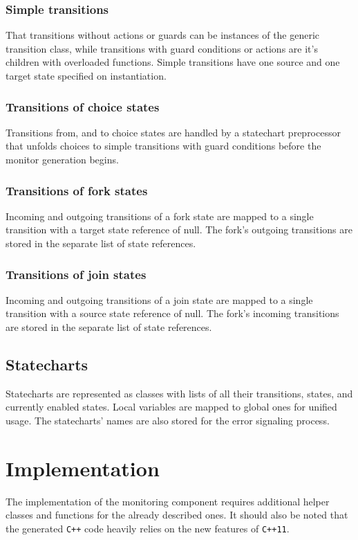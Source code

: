 {    \subsubsection{Simple transitions}
That transitions without actions or guards can be instances of the generic transition class, while transitions with guard conditions or actions are it's children with overloaded functions. Simple transitions have one source and one 
target state specified on instantiation.
    \subsubsection{Transitions of choice states}
Transitions from, and to choice states are handled by a statechart preprocessor that unfolds choices to simple transitions with guard conditions before the monitor generation begins.
    \subsubsection{Transitions of fork states}
Incoming and outgoing transitions of a fork state are mapped to a single transition with a target state reference of null. The fork's outgoing transitions are stored in the separate list of state references.
    \subsubsection{Transitions of join states}
Incoming and outgoing transitions of a join state are mapped to a single transition with a source state reference of null. The fork's incoming transitions are stored in the separate list of state references.
  \subsection{Statecharts}
Statecharts are represented as classes with lists of all their transitions, states, and currently enabled states. Local variables are mapped to global ones for unified usage. The statecharts' names are also stored for the error signaling process.
\section{Implementation}
The implementation of the monitoring component requires additional helper classes and functions for the already described ones. It should also be noted that the generated \verb!C++! code heavily relies on the new features of \verb!C++11!.
}
